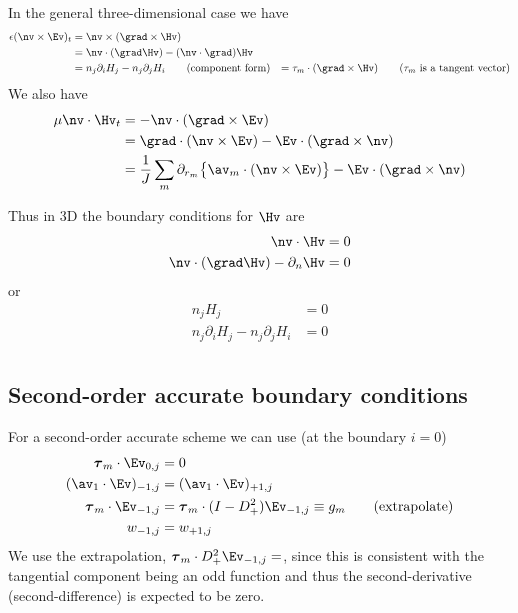 In the general three-dimensional case we have
\begin{align*}
  \eps (\nv\times\Ev)_t &= \nv\times(\grad\times\Hv) \\
                   &= \nv\cdot(\grad\Hv) - (\nv\cdot\grad)\Hv \\
                   &= n_j \partial_i H_j - n_j \partial_j H_i \qquad\mbox{(component form)}
                   &= \tau_m\cdot(\grad\times\Hv) \qquad\mbox{($\tau_m$ is a tangent vector)}
\end{align*}
We also have
\begin{align*}
 \mu \nv\cdot\Hv_t & = -\nv\cdot(\grad\times\Ev) \\
                   &= \grad\cdot(\nv\times\Ev) - \Ev\cdot(\grad\times\nv) \\
                   &= {1\over J}\sum_m \partial_{r_m}\big\{ \av_m\cdot(\nv\times\Ev)\big\}
                                                  - \Ev\cdot(\grad\times\nv) \\
\end{align*}

Thus in 3D the boundary conditions for $\Hv$ are
\begin{align*} 
  \nv\cdot\Hv &= 0 \\
  \nv\cdot(\grad\Hv) - \partial_n \Hv &= 0
\end{align*}
or 
\begin{align*} 
  n_j H_j  &= 0 \\
  n_j \partial_i H_j - n_j \partial_j H_i &= 0 \\
\end{align*}

\subsection{Second-order accurate boundary conditions}

For a second-order accurate scheme we can use (at the boundary $i=0$)
\begin{align*}
    \tauv_m\cdot\Ev_{0,j}  &=0  \\
     (\av_1\cdot\Ev)_{-1,j} &= (\av_1\cdot\Ev)_{+1,j} \\
    \tauv_m\cdot\Ev_{-1,j} &= \tauv_m \cdot (I-D_+^2)\Ev_{-1,j} \equiv g_m   \qquad\mbox{(extrapolate)}\\
     w_{-1,j} &= w_{+1,j}
\end{align*}
We use the extrapolation, $\tauv_m\cdot D_+^2\Ev_{-1,j}=$, since this is consistent with the
tangential component being an odd function and thus the second-derivative (second-difference)
is expected to be zero.

